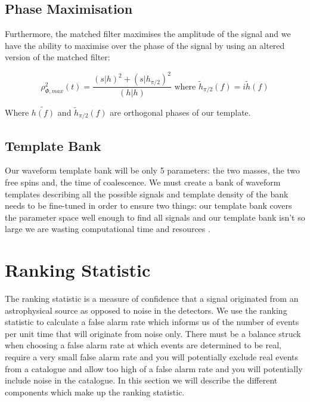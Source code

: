 \subsection{\label{sec:phase-maximisation}Phase Maximisation}

Furthermore, the matched filter maximises the amplitude of the \gw signal and we have the ability to maximise over the phase of the signal by using an altered version of the matched filter:

\begin{equation}
   \text{$\rho^2_{\Phi,max}(t) = \frac{(s|h)^2 + (s|h_{\pi/2})^2}{(h|h)}$ where $\tilde{h}_{\pi/2}(f) = i \tilde{h}(f)$}
   \label{eqn:phase_mf}
\end{equation}

Where $\tilde{h(f)}$ and $\tilde{h}_{\pi/2}(f)$ are orthogonal phases of our template.

\subsection{\label{sec:template-bank}Template Bank}

Our waveform template bank will be only 5 parameters: the two masses, the two free spins and, the time of coalescence. We must create a bank of waveform templates describing all the possible signals and template density of the bank needs to be fine-tuned in order to ensure two things: our template bank covers the parameter space well enough to find all signals and our template bank isn't so large we are wasting computational time and resources \cite{Owen:tbank}.

\section{\label{sec:ranking-statistic}Ranking Statistic}
The ranking statistic is a measure of confidence that a signal originated from an astrophysical source as opposed to noise in the detectors. We use the ranking statistic to calculate a false alarm rate which informs us of the number of events per unit time that will originate from noise only. There must be a balance struck when choosing a false alarm rate at which events are determined to be real, require a very small false alarm rate and you will potentially exclude real events from a catalogue and allow too high of a false alarm rate and you will potentially include noise in the catalogue. In this section we will describe the different components which make up the ranking statistic.

